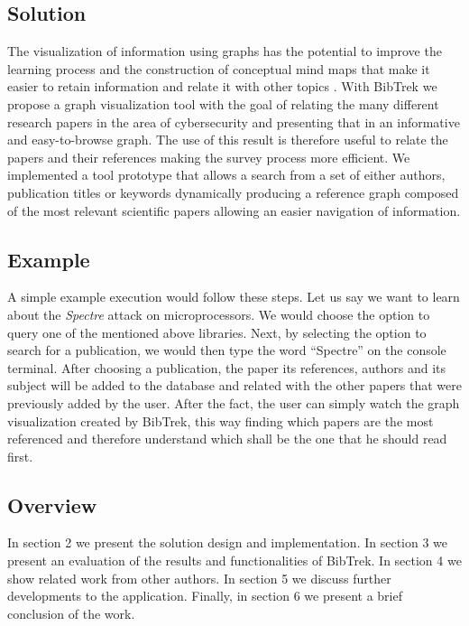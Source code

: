 \documentclass[twocolumn]{article}
\begin{document}
\subsection{Solution}
The visualization of information using graphs has the potential to improve the learning process and the construction of conceptual mind maps that make it easier to retain information and relate it with other topics \cite{enhancinglearningwithvisualizationtechniques}. With BibTrek we propose a graph visualization tool with the goal of relating the many different research papers in the area of cybersecurity and presenting that in an informative and easy-to-browse graph. The use of this result is therefore useful to relate the papers and their references making the survey process more efficient. We implemented a tool prototype that allows a search from a set of either authors, publication titles or keywords dynamically producing a reference graph composed of the most relevant scientific papers allowing an easier navigation of information. 

\subsection{Example}
A simple example execution would follow these steps. Let us say we want to learn about the \emph{Spectre} attack on microprocessors. We would choose the option to query one of the mentioned above libraries. Next, by selecting the option to search for a publication, we would then type the word ``Spectre'' on the console terminal. After choosing a publication, the paper its references, authors and its subject will be added to the database and related with the other papers that were previously added by the user. After the fact, the user can simply watch the graph visualization created by BibTrek, this way finding which papers are the most referenced and therefore understand which shall be the one that he should read first.


\subsection{Overview}
In section 2 we present the solution design and implementation. In section 3 we present an evaluation of the results and functionalities of BibTrek. In section 4 we show related work from other authors. In section 5 we discuss further developments to the application. Finally, in section 6 we present a brief conclusion of the work. \\[1\baselineskip]
\end{document}
